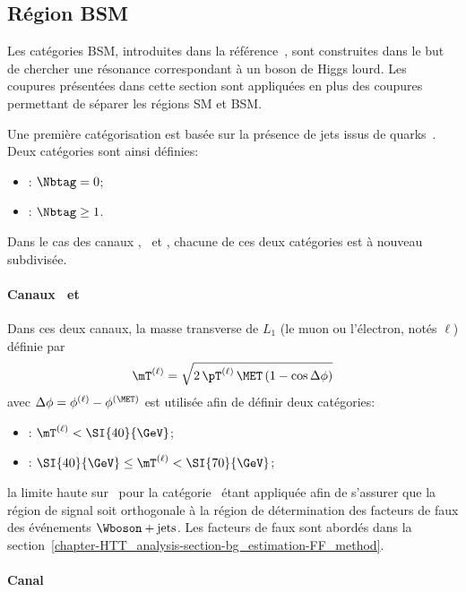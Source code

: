 \subsection{Région \og BSM \fg{}}\label{chapter-HTT_analysis-section-categorisation-BSM}
Les catégories BSM, introduites dans la référence~\cite{CMS-PAS-HIG-17-020}, sont construites dans le but de chercher une résonance correspondant à un boson de Higgs lourd.
Les coupures présentées dans cette section sont appliquées en plus des coupures permettant de séparer les régions SM et BSM.
\par
Une première catégorisation est basée sur la présence de jets issus de quarks~\quarkb.
Deux catégories sont ainsi définies:
\begin{itemize}
\item \CATnobtag: $\Nbtag =0$;
\item \CATbtag: $\Nbtag\geq1$.
\end{itemize}
Dans le cas des canaux \mu\tauh, \ele\tauh\ et \ele\mu, chacune de ces deux catégories est à nouveau subdivisée.
\paragraph{Canaux \mu\tauh\ et \ele\tauh}
Dans ces deux canaux, la masse transverse de $L_1$ (le muon ou l'électron, notés $\ell$) définie par
\begin{equation}
\mT^{(\ell)} = \sqrt{2 \, \pT^{(\ell)} \, \MET \, (1-\cos\Delta\phi)} \label{eq-mT_def-ell}
\end{equation}
avec $\Delta\phi = \phi^{(\ell)} - \phi^{(\MET)}$
est utilisée afin de définir deux catégories:
\begin{itemize}
\item \CATtightmt: $\mT^{(\ell)} < \SI{40}{\GeV}$;
\item \CATloosemt: $\SI{40}{\GeV} \leq \mT^{(\ell)} < \SI{70}{\GeV}$;
\end{itemize}
la limite haute sur \mT\ pour la catégorie \CATloosemt\ étant appliquée afin de s'assurer que la région de signal soit orthogonale à la région de détermination des facteurs de faux des événements $\Wboson+\text{jets}$. Les facteurs de faux sont abordés dans la section~\ref{chapter-HTT_analysis-section-bg_estimation-FF_method}.
\paragraph{Canal \ele\mu}